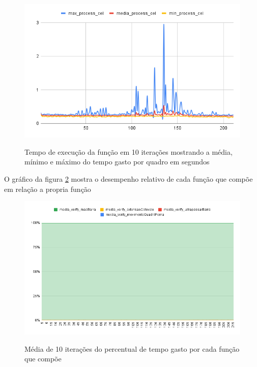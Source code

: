 \begin{figure}[H]
	\centering
	\caption{Tempo de execução da função  em 10 iterações mostrando a média, mínimo e máximo do tempo gasto por quadro em segundos}
	\includegraphics[scale=0.8]{figuras/grafico/process_cell.png}
	\label{graf:G11}
\end{figure}








O gráfico da figura \ref{graf:G12} mostra o desempenho relativo de cada função que compõe  em relação a propria função 

\begin{figure}[H]
	\centering
	\caption{ Média de 10 iterações do percentual de tempo gasto por cada função que compõe  }
	\includegraphics[scale=0.6]{figuras/grafico/comp_char_AFD.png}
	\label{graf:G12}
\end{figure}




